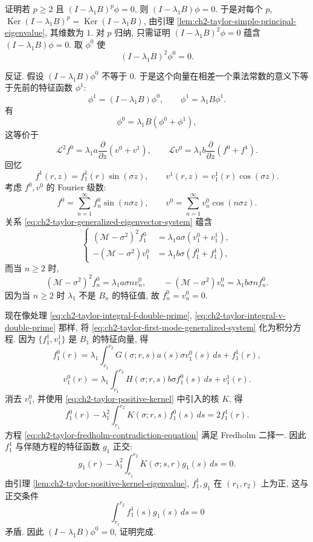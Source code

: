 \begin{Proof}
证明若 $p\geq2$ 且 $(I-\lambda_1B)^p\phi=0$, 则 $(I-\lambda_1B)\phi=0$. 于是对每个 $p$, $\operatorname{Ker}(I-\lambda_1B)^p=\operatorname{Ker}(I-\lambda_1B)$, 由引理 \ref{lem:ch2-taylor-simple-principal-eigenvalue}, 其维数为 $1$. 对 $p$ 归纳, 只需证明 $(I-\lambda_1B)^2\phi=0$ 蕴含 $(I-\lambda_1B)\phi=0$. 取 $\phi^0$ 使
\[
(I-\lambda_1B)^2\phi^0=0.
\]

\hypertarget{chapter-02-page-177}{}
反证. 假设 $(I-\lambda_1B)\phi^0$ 不等于 $0$. 于是这个向量在相差一个乘法常数的意义下等于先前的特征函数 $\phi^1$:
\begin{equation}
\phi^1=(I-\lambda_1B)\phi^0,
\qquad
\phi^1=\lambda_1B\phi^1.
\label{eq:ch2-taylor-generalized-eigenvector-relations}
\end{equation}
有
\[
\phi^0=\lambda_1B(\phi^0+\phi^1),
\]
这等价于
\begin{equation}
\mathcal L^2f^0=\lambda_1a\frac\partial{\partial z}(v^0+v^1),
\qquad
\mathcal Lv^0=\lambda_1b\frac\partial{\partial z}(f^0+f^1).
\label{eq:ch2-taylor-generalized-eigenvector-system}
\end{equation}
回忆
\[
f^1(r,z)=f_1^1(r)\sin(\sigma z),
\qquad
v^1(r,z)=v_1^1(r)\cos(\sigma z).
\]
考虑 $f^0,v^0$ 的 Fourier 级数:
\[
f^0=\sum_{n=1}^{\infty}f_n^0\sin(n\sigma z),
\qquad
v^0=\sum_{n=1}^{\infty}v_n^0\cos(n\sigma z).
\]
关系 \eqref{eq:ch2-taylor-generalized-eigenvector-system} 蕴含
\begin{equation}
\left\{
\begin{aligned}
(\mathcal M-\sigma^2)^2f_1^0&=\lambda_1a\sigma(v_1^0+v_1^1),\\
-(\mathcal M-\sigma^2)v_1^0&=\lambda_1b\sigma(f_1^0+f_1^1),
\end{aligned}
\right.
\label{eq:ch2-taylor-first-mode-generalized-system}
\end{equation}
而当 $n\geq2$ 时,
\[
(\mathcal M-\sigma^2)^2f_n^0=\lambda_1a\sigma n v_n^0,
\qquad
-(\mathcal M-\sigma^2)v_n^0=\lambda_1b\sigma n f_n^0.
\]
因为当 $n\geq2$ 时 $\lambda_1$ 不是 $B_n$ 的特征值, 故 $f_n^0=v_n^0=0$.

现在像处理 \eqref{eq:ch2-taylor-integral-f-double-prime}, \eqref{eq:ch2-taylor-integral-v-double-prime} 那样, 将 \eqref{eq:ch2-taylor-first-mode-generalized-system} 化为积分方程. 因为 $\{f_1^1,v_1^1\}$ 是 $B_1$ 的特征向量, 得
\[
f_1^0(r)=\lambda_1\int_{r_1}^{r_2}G(\sigma;r,s)a(s)\sigma v_1^0(s)\,ds+f_1^1(r),
\]
\[
v_1^0(r)=\lambda_1\int_{r_1}^{r_2}H(\sigma;r,s)b\sigma f_1^0(s)\,ds+v_1^1(r).
\]
消去 $v_1^0$, 并使用 \eqref{eq:ch2-taylor-positive-kernel} 中引入的核 $K$, 得
\begin{equation}
f_1^0(r)-\lambda_1^2\int_{r_1}^{r_2}K(\sigma;r,s)f_1^0(s)\,ds
=2f_1^1(r).
\label{eq:ch2-taylor-fredholm-contradiction-equation}
\end{equation}
方程 \eqref{eq:ch2-taylor-fredholm-contradiction-equation} 满足 Fredholm 二择一. 因此 $f_1^1$ 与伴随方程的特征函数 $g_1$ 正交:
\[
g_1(r)-\lambda_1^2\int_{r_1}^{r_2}K(\sigma;s,r)g_1(s)\,ds=0.
\]
由引理 \ref{lem:ch2-taylor-positive-kernel-eigenvalue}, $f_1^1,g_1$ 在 $(r_1,r_2)$ 上为正, 这与正交条件
\[
\int_{r_1}^{r_2}f_1^1(s)g_1(s)\,ds=0
\]
矛盾. 因此 $(I-\lambda_1B)\phi^0=0$, 证明完成.
\end{Proof}

